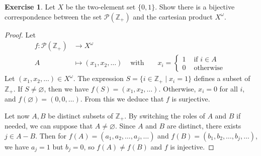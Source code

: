 \documentclass[11pt,a4paper,twoside]{article}
\theoremstyle{definition}
\newcounter{excounter}
\newtheorem{exercise}[excounter]{Exercise}
\begin{document}
\begin{exercise}

  Let $X$ be the two-element set $\{ 0, 1 \}$. Show there is a bijective correspondence
  between the set $\mathscr{P} ( \mathbb{Z}_+ )$ and the cartesian product $X^\omega$.

\end{exercise}

\begin{proof}

  Let
  \begin{align*}
    f : \mathscr{P} ( \mathbb{Z}_+ ) &\to X^\omega \\
    A &\mapsto (x_1, x_2, \dotsc) &\text{ with } &&x_i = \begin{cases}
      1 &\text{ if } i \in A \\
      0 &\text{ otherwise }
    \end{cases}
  \end{align*}
  Let $(x_1, x_2, \dotsc) \in X^\omega$. The expression $S = \{ i \in \mathbb{Z}_+ \mid x_i = 1 \}$ defines a subset of $\mathbb{Z}_+$.
  If $S \neq \varnothing$, then we have $f (S) = (x_1, x_2, \dotsc)$. Otherwise, $x_i = 0$ for all $i$, and $f (\varnothing) = (0, 0, \dotsc)$.
  From this we deduce that $f$ is surjective.

  Let now $A, B$ be distinct subsets of $\mathbb{Z}_+$. By switching the roles of $A$ and $B$ if needed, we can suppose that $A \neq \varnothing$.
  Since $A$ and $B$ are distinct, there exists $j \in A - B$. Then for $f (A) = (a_1, a_2, \dotsc, a_j, \dotsc)$ and $f (B) = (b_1, b_2, \dotsc, b_j, \dotsc)$,
  we have $a_j = 1$ but $b_j = 0$, so $f (A) \neq f (B)$ and $f$ is injective.

\end{proof}
\end{document}
